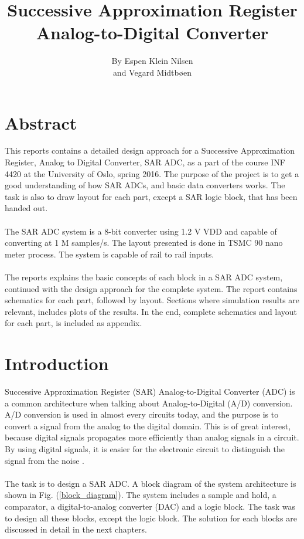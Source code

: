\documentclass[english, 12pt, a4paper]{ifimaster}
\title{ \huge{Successive Approximation Register Analog-to-Digital Converter}}
\author{By Espen Klein Nilsen\\ and Vegard Midtbøen}
\begin{document}
\ififorside{}
 \frontmatter{}
\maketitle{} \newpage

\chapter*{Abstract}
This reports contains a detailed design approach for a Successive Approximation Register, Analog to
Digital Converter, SAR ADC, as a part of the course INF 4420 at the University of Oslo, spring 
2016. The purpose of the project is to get a good understanding of how SAR ADCs, and basic data 
converters works. The task is also to draw layout for each part, except a SAR logic block, that has
been handed out.\\
\\
The SAR ADC system is a 8-bit converter using 1.2 V VDD and capable of converting at 1 M samples/s. 
The layout presented is done in TSMC 90 nano meter process. The system is capable of rail to rail inputs.\\
\\
The reports explains the basic concepts of each block in a SAR ADC system, continued with
the design approach for the complete system. The report contains schematics for each part, followed 
by layout. Sections where simulation results are relevant, includes plots of the results. In the 
end, complete schematics and layout for each part, is included as appendix. 

\tableofcontents{} \newpage
\listoffigures{} 
\listoftables{} \newpage


 \mainmatter{}        

\chapter{Introduction} 
Successive Approximation Register (SAR) Analog-to-Digital Converter (ADC) is a common architecture when talking about Analog-to-Digital (A/D) conversion. A/D conversion is used in almost every
circuits today, and the purpose is to convert a signal from the analog to the digital domain. This is of great interest, because digital signals propagates more efficiently than analog signals in a 
circuit. By using digital signals, it is easier for the electronic circuit to distinguish the signal from the noise \cite{basic-adc}.\\
\\
The task is to design a SAR ADC. A block diagram of the system architecture is shown in Fig. (\ref{block_diagram}). The system includes a sample and hold, a comparator, a digital-to-analog 
converter (DAC) and a logic block. The task was to design all these blocks, except the logic block. The solution for each blocks are discussed in detail in the next chapters.  
\end{document}
